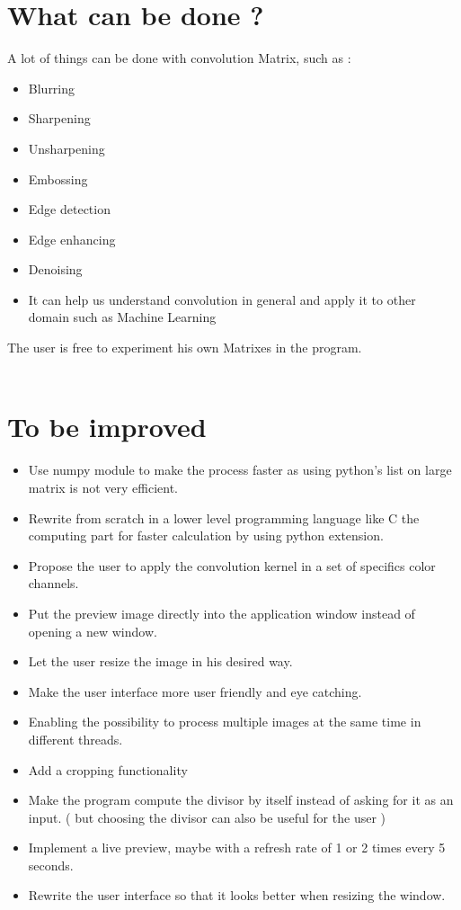 \documentclass[]{article}
\begin{document}
\section{What can be done ?}
A lot of things can be done with convolution Matrix, such as : 
\\
\begin {itemize}
	\item Blurring
	\item Sharpening
	\item Unsharpening
	\item Embossing
	\item Edge detection
	\item Edge enhancing
	\item Denoising
	\item It can help us understand convolution in general and apply it to other domain such as Machine Learning
\end {itemize}

The user is free to experiment his own Matrixes in the program. 
\\\\
\newpage



\section{To be improved}
\begin {itemize}
	\item Use numpy module to make the process faster as using python's list on large matrix is not very efficient.
	\item Rewrite from scratch in a lower level programming language like C the computing part for faster calculation by using python extension.
	\item Propose the user to apply the convolution kernel in a set of specifics color channels.
	\item Put the preview image directly into the application window instead of opening a new window.
	\item Let the user resize the image in his desired way.
	\item Make the user interface more user friendly and eye catching.
	\item Enabling the possibility to process multiple images at the same time in different threads.
	\item Add a cropping functionality
	\item Make the program compute the divisor by itself instead of asking for it as an input. ( but choosing the divisor can also be useful for the user )
	\item Implement a live preview, maybe with a refresh rate of 1 or 2 times every 5 seconds.
	\item Rewrite the user interface so that it looks better when resizing the window.
\end {itemize}
\end{document}

